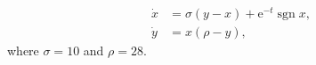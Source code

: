 \begin{align}
  \dot{x} &= \sigma\left(y-x\right)+\mathrm{e}^{-t}\operatorname{sgn} x, \label{eq:mathlive-x} \\
  \dot{y} &= x(\rho-y), \label{eq:mathlive-y}
\end{align}
where $\sigma = 10$ and $\rho = 28$.
